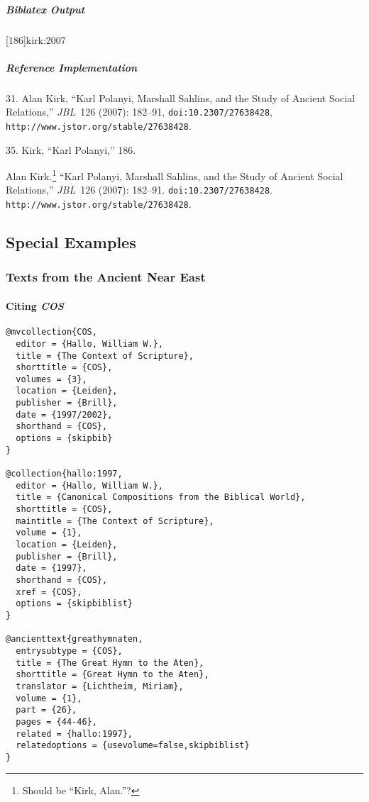 \documentclass[a4paper]{article}
\newenvironment{biboutput}{%
  \subparagraph{Biblatex Output}
}{\color{black}}
\newenvironment{refimp}{%
  \subparagraph{Reference Implementation}
  \color{reference-colour}
  \rm
}{\par\color{black}}
\begin{document}
\begin{biboutput}
  [186]{kirk:2007}
\end{biboutput}

\begin{refimp}
  \hspace*{\bibindent}31. Alan Kirk, “Karl Polanyi, Marshall Sahlins, and the
  Study of Ancient Social Relations,” \emph{JBL}~126 (2007): 182–91,
  \nolinkurl{doi:10.2307/27638428},
  \nolinkurl{http://www.jstor.org/stable/27638428}.

  \hspace*{\bibindent}35. Kirk, “Karl Polanyi,” 186.

  \hangindent\bibindent Alan Kirk.\footnote{Should be “Kirk, Alan.”?} “Karl
  Polanyi, Marshall Sahlins, and the Study of Ancient Social Relations,”
  \emph{JBL}~126 (2007): 182–91. \nolinkurl{doi:10.2307/27638428}.
  \nolinkurl{http://www.jstor.org/stable/27638428}.

\end{refimp}

\subsection{Special Examples}

\subsubsection{Texts from the Ancient Near East}

\paragraph{Citing \textsl{COS}}

\begin{lstlisting}
@mvcollection{COS,
  editor = {Hallo, William W.},
  title = {The Context of Scripture},
  shorttitle = {COS},
  volumes = {3},
  location = {Leiden},
  publisher = {Brill},
  date = {1997/2002},
  shorthand = {COS},
  options = {skipbib}
}

@collection{hallo:1997,
  editor = {Hallo, William W.},
  title = {Canonical Compositions from the Biblical World},
  shorttitle = {COS},
  maintitle = {The Context of Scripture},
  volume = {1},
  location = {Leiden},
  publisher = {Brill},
  date = {1997},
  shorthand = {COS},
  xref = {COS},
  options = {skipbiblist}
}

@ancienttext{greathymnaten,
  entrysubtype = {COS},
  title = {The Great Hymn to the Aten},
  shorttitle = {Great Hymn to the Aten},
  translator = {Lichtheim, Miriam},
  volume = {1},
  part = {26},
  pages = {44-46},
  related = {hallo:1997},
  relatedoptions = {usevolume=false,skipbiblist}
}
\end{lstlisting}
\end{document}
